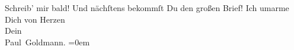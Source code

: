 \begin{ledgroupsized}[t]{13cm}
           \pstart
           Schreib’ mir bald!\pend
           \pstart
           Und nächſtens bekommſt Du den großen Brief!\pend
           \pstart
           Ich umarme {\\[\baselineskip]}Dich von Herzen {\\[\baselineskip]}Dein {\\[\baselineskip]}\spacefill\mbox{Paul Goldmann.}\pend
           \leftskip=0em{}
         
         \endnumbering{}\end{ledgroupsized}  \newcommand{\dateiname}{L02735}\newcommand{\titel}{Paul Goldmann an Arthur Schnitzler, 19. 5. [1895]}\newcommand{\editorInnen}{Martin Anton Müller und Laura Untner}
      
